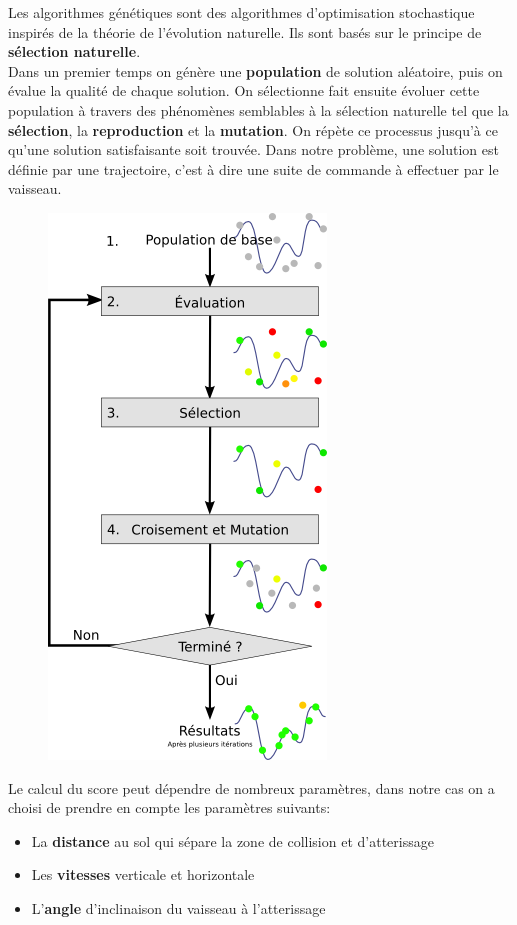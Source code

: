 \documentclass[french,a4paper,10pt,twocolumn]{article}
\begin{document}
Les algorithmes génétiques sont des algorithmes d'optimisation stochastique inspirés de la théorie de l'évolution naturelle.
Ils sont basés sur le principe de \textbf{sélection naturelle}.\\
Dans un premier temps on génère une \textbf{population} de solution aléatoire, puis on évalue la qualité de chaque solution.
On sélectionne fait ensuite évoluer cette population à travers des phénomènes semblables à la sélection naturelle tel que la \textbf{sélection}, la \textbf{reproduction} et la \textbf{mutation}.
On répète ce processus jusqu'à ce qu'une solution satisfaisante soit trouvée.
Dans notre problème, une solution est définie par une trajectoire, c'est à dire une suite de commande à effectuer par le vaisseau.\\

\begin{figure}[h]
    \centering
    \includegraphics[scale=0.5]{images/schema_simple_algorithme_genetique.png}
    \caption{\cite[]{schema_genetic_algorithm_image}}\label{fig:genetic_algorithm}
\end{figure}

Le calcul du score peut dépendre de nombreux paramètres, dans notre cas on a choisi de prendre en compte les paramètres suivants:
\begin{itemize}
    \item La \textbf{distance} au sol qui sépare la zone de collision et d'atterissage
    \item Les \textbf{vitesses} verticale et horizontale 
    \item L'\textbf{angle} d'inclinaison du vaisseau à l'atterissage
\end{itemize}
\end{document}
